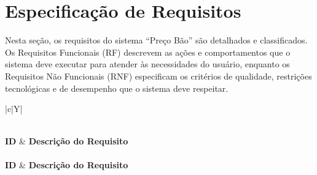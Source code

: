 \section{Especificação de Requisitos}

Nesta seção, os requisitos do sistema ``Preço Bão'' são detalhados e classificados. Os Requisitos Funcionais (RF) descrevem as ações e comportamentos que o sistema deve executar para atender às necessidades do usuário, enquanto os Requisitos Não Funcionais (RNF) especificam os critérios de qualidade, restrições tecnológicas e de desempenho que o sistema deve respeitar.

\begingroup\footnotesize{}
\begin{xltabular}{\textwidth}{|c|Y|}
\caption{Especificação dos Requisitos Funcionais}\label{qua:requisitos_funcionais}\\
        \hline
        \textbf{ID} & \textbf{Descrição do Requisito} \\
        \hline\endfirsthead
{}\\
        \hline
        \textbf{ID} & \textbf{Descrição do Requisito} \\
        \hline\endhead
{}\\\endfoot
{}\\\endlastfoot


\end{xltabular}
